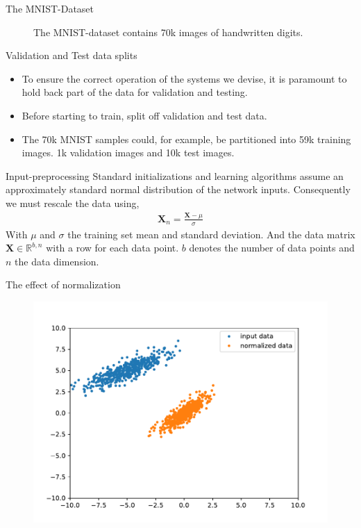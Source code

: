\documentclass[notes]{beamer}
\begin{document}
    \begin{frame}{The MNIST-Dataset}
      \begin{figure}
        
        \caption{The MNIST-dataset contains 70k images of handwritten digits.}
      \end{figure}
    \end{frame}

    \begin{frame}{Validation and Test data splits}
      \begin{itemize}
        \item To ensure the correct operation of the systems we devise, it is paramount to 
        hold back part of the data for validation and testing.
        \item Before starting to train, split off validation and test data.
        \item The 70k MNIST samples could, for example, be partitioned into 59k training images.
        1k validation images and 10k test images. 
      \end{itemize}
    \end{frame}

    \begin{frame}{Input-preprocessing}
      Standard initializations and learning algorithms assume an approximately standard normal distribution
      of the network inputs. Consequently we must rescale the data using,
      \begin{align}
        \mathbf{X}_n = \frac{\mathbf{X} - \mu}{\sigma}
      \end{align}
      With $\mu$ and $\sigma$ the training set mean and standard deviation. And the data matrix $\mathbf{X} \in \mathbb{R}^{b,n}$ with a row for each data point.
      $b$ denotes the number of data points and $n$ the data dimension.
    \end{frame}

    \begin{frame}{The effect of normalization}
      \begin{figure}
      \includegraphics[width=\linewidth]{./figures/normalized.pdf}
      \end{figure}
    \end{frame}
\end{document}
